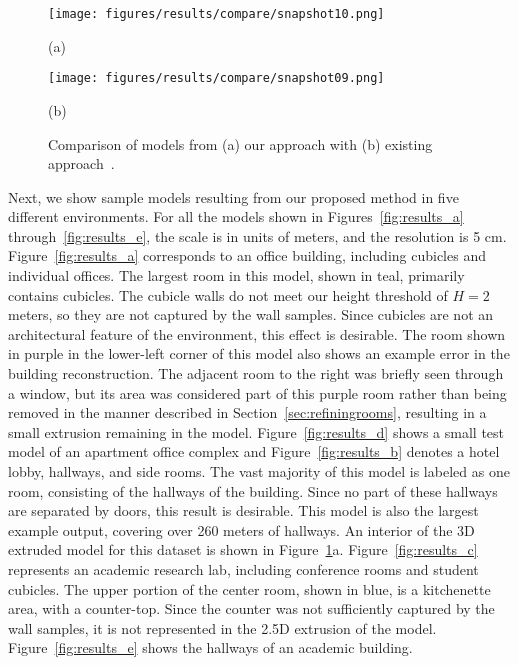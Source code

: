 \documentclass[a4paper,twoside]{article}
\begin{document}
\begin{figure}[t]
   \centering
   \texttt{[image: figures/results/compare/snapshot10.png]}
   \centerline{(a)}
   \hfill
   \texttt{[image: figures/results/compare/snapshot09.png]}
   \centerline{(b)}
   \caption{Comparison of models from (a) our approach with (b) existing approach~\cite{Turner13}.}
   \label{fig:compare_to_carving}
\end{figure}

Next, we show sample models resulting from our proposed method in five different environments.  For all the models shown in Figures~\ref{fig:results_a} through~\ref{fig:results_e}, the scale is in units of meters, and the resolution is 5 cm.  Figure~\ref{fig:results_a} corresponds to an office building, including cubicles and individual offices.  The largest room in this model, shown in teal, primarily contains cubicles.  The cubicle walls do not meet our height threshold of $H=2$ meters, so they are not captured by the wall samples.  Since cubicles are not an architectural feature of the environment, this effect is desirable.  The room shown in purple in the lower-left corner of this model also shows an example error in the building reconstruction.  The adjacent room to the right was briefly seen through a window, but its area was considered part of this purple room rather than being removed in the manner described in Section~\ref{sec:refiningrooms}, resulting in a small extrusion remaining in the model.
Figure~\ref{fig:results_d} shows a small test model of an apartment office complex and Figure~\ref{fig:results_b} denotes a hotel lobby, hallways, and side rooms.  The vast majority of this model is labeled as one room, consisting of the hallways of the building.  Since no part of these hallways are separated by doors, this result is desirable.  This model is also the largest example output, covering over 260 meters of hallways. An interior of the 3D extruded model for this dataset is shown in Figure~\ref{fig:compare_to_carving}a.  Figure~\ref{fig:results_c} represents an academic research lab, including conference rooms and student cubicles.  The upper portion of the center room, shown in blue, is a kitchenette area, with a counter-top.  Since the counter was not sufficiently captured by the wall samples, it is not represented in the 2.5D extrusion of the model. Figure~\ref{fig:results_e} shows the hallways of an academic building.
\end{document}

